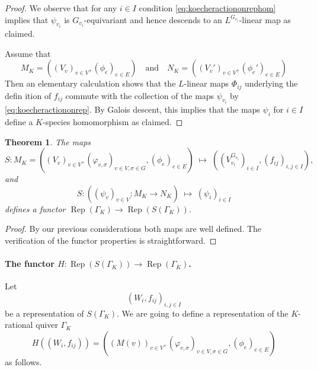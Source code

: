 \documentclass[a4paper,12pt,reqno]{amsart}
\DeclareMathOperator{\Rep}{\mathrm{Rep}}
\theoremstyle{plain}
\newtheorem{theorem}{Theorem}[section]
\theoremstyle{remark}
\begin{document}
      \begin{proof}
        We observe that for any $i\in I$ condition \eqref{eq:koecheractiononrephom} implies that $\psi_{v_i}$ is $G_{v_i}$-equivariant and hence descends to an $L^{G_{v_i}}$-linear map as claimed.
        
      Assume that
      \[
      M_K=((V_v)_{v\in V},(\phi_e)_{e\in E})\quad\text{and}\quad
      N_K=((V_v')_{v\in V},(\phi_e')_{e\in E})
      \]
      Then an elementary calculation shows that the $L$-linear maps $\Phi_{ij}$ underlying the defin ition of $f_{ij}$ commute with the collection of the maps $\psi_{v_i}$ by \eqref{eq:koecheractiononrep}. By Galois descent, this implies that the maps $\psi_{i}$ for $i\in I$ define a $K$-species homomorphism as claimed.      
      \end{proof}

      \begin{theorem}\label{thm:quiveretalespeciesrepresentations}
        The maps
        \begin{equation}
        S\colon M_K=((V_v)_{v\in V},(\varphi_{v,\sigma})_{v\in V,\sigma\in G},(\phi_e)_{e\in E})\;\mapsto\;((V_{v_i}^{G_{v_i}})_{i\in I},(f_{ij})_{i,j\in I}),
        \end{equation}
        and
        \begin{equation}
        S\colon \left((\psi_v)_{v\in V}\colon M_K\to N_K\right)\;\mapsto\;(\psi_i)_{i\in I}
        \end{equation}
        defines a functor $\Rep(\Gamma_K)\to\Rep(S(\Gamma_K))$.
      \end{theorem}

      \begin{proof}
        By our previous considerations both maps are well defined. The verification of the functor properties is straightforward.
      \end{proof}


  \paragraph{The functor $H \colon \Rep(S(\Gamma_K)) \to \Rep(\Gamma_K)$.}
  Let
  \[
  (W_{i}, f_{ij})_{i,j\in I}
  \]
  be a representation of $S(\Gamma_K)$. We are going to define a representation of the $K$-rational quiver $\Gamma_K$
  \[
  H((W_i, f_{ij})) = ((M(v))_{v\in V}, (\varphi_{v,\sigma})_{v\in V,\sigma\in G},(\phi_e)_{e\in E})
  \]
  as follows.
\end{document}
